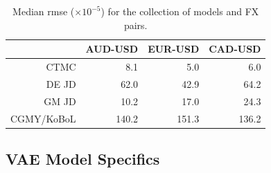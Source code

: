 \documentclass[onefignum,onetabnum]{siamonline190516}
\begin{document}
\begin{table}
\renewcommand{\arraystretch}{1}
\footnotesize
\centering
    \begin{tabular}{rrrr}
    \addlinespace
    \toprule
          & AUD-USD & EUR-USD & CAD-USD \\
    \midrule
    CTMC  &          8.1  &          5.0  &          6.0  \\ 
    DE JD    &        62.0  &        42.9  &        64.2  \\
    GM JD   &        10.2  &        17.0  &        24.3  \\
    CGMY/KoBoL  &      140.2  &      151.3  &      136.2  \\
    \bottomrule
    \end{tabular}
\vspace*{-0.5em}    
\caption{Median rmse ($\times10^{-5}$) for the collection of models and FX pairs.}
\vspace*{-1em}
  \label{tab:rmse}
\end{table}

\subsection{VAE Model Specifics}
\end{document}
